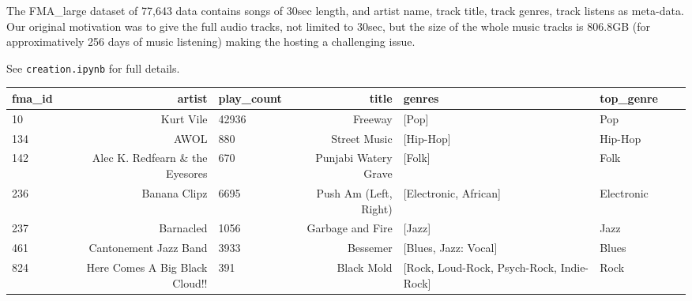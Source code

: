 \documentclass{article}
\begin{document}
The FMA\_large dataset of 77,643 data contains songs of 30sec length, and artist name, track title, track genres, track listens as meta-data. Our original motivation was to give the full audio tracks, not limited to 30sec, but the size of the whole music tracks is 806.8GB (for approximatively 256 days of music listening) making the hosting a challenging issue.

See \texttt{creation.ipynb} for full details.

\begin{table}
	\tiny
	\centering
	\begin{tabular}{lrlrllll}
	\toprule
	 fma\_id &                                             artist &  play\_count &                                              title &                                             genres &            top\_genre  \\
	 \toprule
		10 &                                          Kurt Vile &       42936 &                                            Freeway &                                              [Pop] &                  Pop  \\
		134 &                                               AWOL &         880 &                                       Street Music &                                          [Hip-Hop] &              Hip-Hop  \\
		 142 &                    Alec K. Redfearn \& the Eyesores &         670 &                               Punjabi Watery Grave &                                             [Folk] &                 Folk  \\
		 236 &                                       Banana Clipz &        6695 &                              Push Am (Left, Right) &                              [Electronic, African] &           Electronic  \\
		 237 &                                          Barnacled &        1056 &                    Garbage and Fire &                                             [Jazz] &                 Jazz  \\
		 461 &                              Cantonement Jazz Band &        3933 &                                           Bessemer &                               [Blues, Jazz: Vocal] &                Blues  \\
		824 &                     Here Comes A Big Black Cloud!! &         391 &                                         Black Mold &          [Rock, Loud-Rock, Psych-Rock, Indie-Rock] &                 Rock  \\

\end{tabular}
\end{table}
\end{document}
